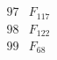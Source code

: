 \documentclass{article}
\begin{document}
{$$\begin{array}{|r|*{7}{r|}}
\\
\hline
97 
 & F_{117} &
 & 
 & 
 & 
 & 
 & 
\\
\hline
98 
 & F_{122} &
 & 
 & 
 & 
 & 
 & 
\\
\hline
99 
 & F_{68} &
 & 
 & 
 & 

\end{array}$$}
\end{document}
